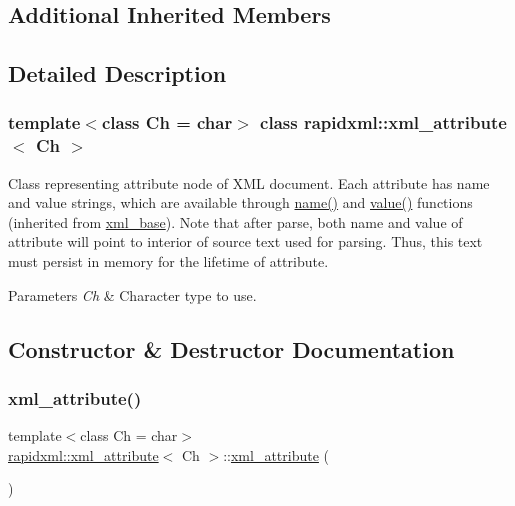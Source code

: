 \subsection*{Additional Inherited Members}


\subsection{Detailed Description}
\subsubsection*{template$<$class Ch = char$>$\newline
class rapidxml\+::xml\+\_\+attribute$<$ Ch $>$}

Class representing attribute node of X\+ML document. Each attribute has name and value strings, which are available through \mbox{\hyperlink{classrapidxml_1_1xml__base_aef8ae147fbee59209f714274afc80dc4}{name()}} and \mbox{\hyperlink{classrapidxml_1_1xml__base_a6af65de5e59ac497cd69838f8a89d602}{value()}} functions (inherited from \mbox{\hyperlink{classrapidxml_1_1xml__base}{xml\+\_\+base}}). Note that after parse, both name and value of attribute will point to interior of source text used for parsing. Thus, this text must persist in memory for the lifetime of attribute.
\begin{DoxyParams}{Parameters}
{\em Ch} & Character type to use. \\
\hline
\end{DoxyParams}


\subsection{Constructor \& Destructor Documentation}
\mbox{\label{classrapidxml_1_1xml__attribute_a26be291103917d3e8de110d46dd83816}} 
\subsubsection{\texorpdfstring{xml\_attribute()}{xml\_attribute()}}
{\footnotesize\ttfamily template$<$class Ch = char$>$ \\
\mbox{\hyperlink{classrapidxml_1_1xml__attribute}{rapidxml\+::xml\+\_\+attribute}}$<$ Ch $>$\+::\mbox{\hyperlink{classrapidxml_1_1xml__attribute}{xml\+\_\+attribute}} (\begin{DoxyParamCaption}{ }\end{DoxyParamCaption})\hspace{0.3cm}{\ttfamily [inline]}}

